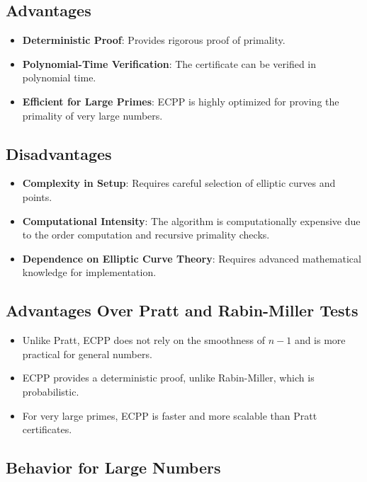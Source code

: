 \documentclass[12pt]{article}
\begin{document}
\subsection*{Advantages}

\begin{itemize}
    \item \textbf{Deterministic Proof}: Provides rigorous proof of primality.
    \item \textbf{Polynomial-Time Verification}: The certificate can be verified in polynomial time.
    \item \textbf{Efficient for Large Primes}: ECPP is highly optimized for proving the primality of very large numbers.
\end{itemize}

\subsection*{Disadvantages}

\begin{itemize}
    \item \textbf{Complexity in Setup}: Requires careful selection of elliptic curves and points.
    \item \textbf{Computational Intensity}: The algorithm is computationally expensive due to the order computation and recursive primality checks.
    \item \textbf{Dependence on Elliptic Curve Theory}: Requires advanced mathematical knowledge for implementation.
\end{itemize}

\subsection*{Advantages Over Pratt and Rabin-Miller Tests}

\begin{itemize}
    \item Unlike Pratt, ECPP does not rely on the smoothness of \( n - 1 \) and is more practical for general numbers.
    \item ECPP provides a deterministic proof, unlike Rabin-Miller, which is probabilistic.
    \item For very large primes, ECPP is faster and more scalable than Pratt certificates.
\end{itemize}

\subsection*{Behavior for Large Numbers}
\end{document}
